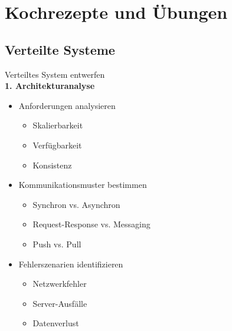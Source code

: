 \section{Kochrezepte und Übungen}

\subsection{Verteilte Systeme}

\begin{KR}{Verteiltes System entwerfen}\\
\textbf{1. Architekturanalyse}
\begin{itemize}
    \item Anforderungen analysieren
    \begin{itemize}
        \item Skalierbarkeit
        \item Verfügbarkeit
        \item Konsistenz
    \end{itemize}
    \item Kommunikationsmuster bestimmen
    \begin{itemize}
        \item Synchron vs. Asynchron
        \item Request-Response vs. Messaging
        \item Push vs. Pull
    \end{itemize}
    \item Fehlerszenarien identifizieren
    \begin{itemize}
        \item Netzwerkfehler
        \item Server-Ausfälle
        \item Datenverlust
    \end{itemize}
\end{itemize}


\end{KR}
